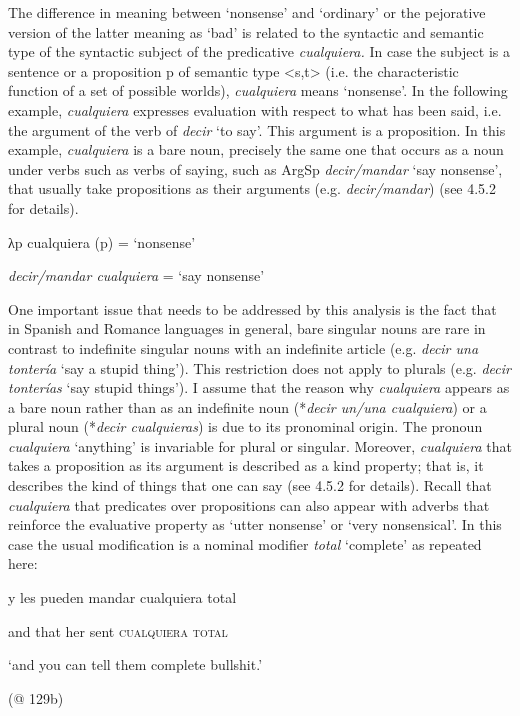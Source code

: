 \documentclass[output=paper]{langscibook}
\begin{document}
The difference in meaning between ‘nonsense’ and ‘ordinary’ or the pejorative version of the latter meaning as ‘bad’ is related to the syntactic and semantic type of the syntactic subject of the predicative \textit{cualquiera.} In case the subject is a sentence or a proposition p of semantic type <s,t> (i.e. the characteristic function of a set of possible worlds), \textit{cualquiera} means ‘nonsense’. In the following example, \textit{cualquiera} expresses evaluation with respect to what has been said, i.e. the argument of the verb of \textit{decir} ‘to say’. This argument is a proposition. In this example, \textit{cualquiera} is a bare noun, precisely the same one that occurs as a noun under verbs such as verbs of saying, such as ArgSp \textit{decir/mandar} ‘say nonsense’, that usually take propositions as their arguments (e.g. \textit{decir/mandar}) (see 4.5.2 for details). 

    λp cualquiera (p) = ‘nonsense’

\textit{decir/mandar cualquiera} = ‘say nonsense’

One important issue that needs to be addressed by this analysis is the fact that in Spanish and Romance languages in general, bare singular nouns are rare in contrast to indefinite singular nouns with an indefinite article (e.g. \textit{decir una tontería} ‘say a stupid thing’). This restriction does not apply to plurals (e.g. \textit{decir tonterías} ‘say stupid things’). I assume that the reason why \textit{cualquiera} appears as a bare noun rather than as an indefinite noun (*\textit{decir un/una cualquiera}) or a plural noun (*\textit{decir cualquieras}) is due to its pronominal origin. The pronoun \textit{cualquiera} ‘anything’ is invariable for plural or singular. Moreover, \textit{cualquiera} that takes a proposition as its argument is described as a kind property; that is, it describes the kind of things that one can say (see 4.5.2 for details). Recall that \textit{cualquiera} that predicates over propositions can also appear with adverbs that reinforce the evaluative property as ‘utter nonsense’ or ‘very nonsensical’. In this case the usual modification is a nominal modifier \textit{total} ‘complete’ as repeated here:

    y  les  pueden  mandar  cualquiera total  

    and  that  her  sent  \textsc{cualquiera} \textsc{total}

    ‘and you can tell them complete bullshit.’

    (@ 129b)
\end{document}
